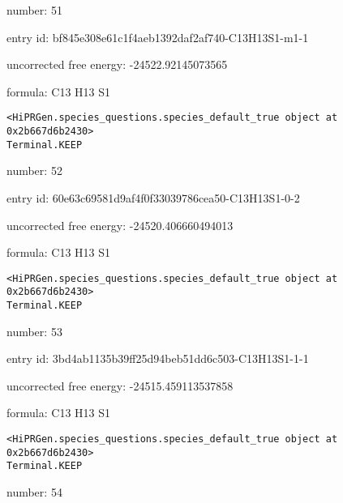 \documentclass{article}
\begin{document}
number: 51



entry id: bf845e308e61c1f4aeb1392daf2af740-C13H13S1-m1-1



uncorrected free energy: -24522.92145073565



formula: C13 H13 S1


\vspace{1cm}
\begin{verbatim}
<HiPRGen.species_questions.species_default_true object at 0x2b667d6b2430>
Terminal.KEEP
\end{verbatim}


number: 52



entry id: 60e63c69581d9af4f0f33039786cea50-C13H13S1-0-2



uncorrected free energy: -24520.406660494013



formula: C13 H13 S1


\vspace{1cm}
\begin{verbatim}
<HiPRGen.species_questions.species_default_true object at 0x2b667d6b2430>
Terminal.KEEP
\end{verbatim}


number: 53



entry id: 3bd4ab1135b39ff25d94beb51dd6c503-C13H13S1-1-1



uncorrected free energy: -24515.459113537858



formula: C13 H13 S1


\vspace{1cm}
\begin{verbatim}
<HiPRGen.species_questions.species_default_true object at 0x2b667d6b2430>
Terminal.KEEP
\end{verbatim}


number: 54
\end{document}
